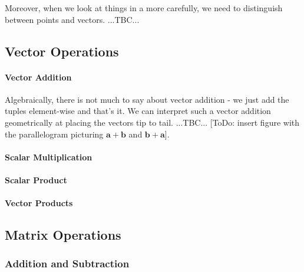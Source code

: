 
\medskip
Moreover, when we look at things in a more carefully, we need to distinguish between points and vectors. ...TBC...



\subsection{Vector Operations}

\paragraph{Vector Addition}
Algebraically, there is not much to say about vector addition - we just add the tuples element-wise and that's it. We can interpret such a vector addition geometrically at placing the vectors tip to tail. ...TBC... [ToDo: insert figure with the parallelogram picturing $\mathbf{a + b}$ and $\mathbf{b + a}$].

\paragraph{Scalar Multiplication}

\paragraph{Scalar Product}

\paragraph{Vector Products}






\subsection{Matrix Operations}
\subsubsection{Addition and Subtraction}

